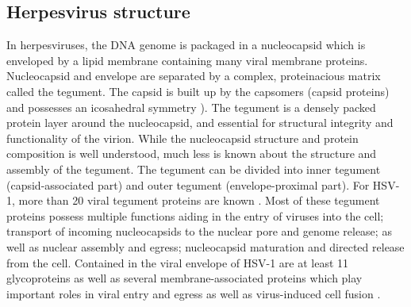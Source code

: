 \pagebreak

\subsection{Herpesvirus structure}
In herpesviruses, the DNA genome is packaged in a nucleocapsid which is enveloped by a lipid membrane containing many viral membrane proteins.
Nucleocapsid and envelope are separated by a complex, proteinacious matrix called the tegument.
The \gls{capsid} is built up by the capsomers (capsid proteins) and possesses an icosahedral symmetry \cite{[4]}).
The tegument is a densely packed protein layer around the nucleocapsid, and essential for structural integrity and functionality of the virion.
While the nucleocapsid structure and protein composition is well understood, much less is known about the structure and assembly of the tegument.
The tegument can be divided into inner tegument (capsid-associated part) and outer tegument (envelope-proximal part).
For HSV-1, more than 20 viral tegument proteins are known \cite{[5, 6]}.
Most of these tegument proteins possess multiple functions aiding in the entry of viruses into the cell; transport of incoming nucleocapsids to the nuclear pore and genome release; as well as nuclear assembly and egress; nucleocapsid maturation and directed release from the cell.
Contained in the viral envelope of HSV-1 are at least 11 glycoproteins as well as several membrane-associated proteins which play important roles in viral entry and egress as well as virus-induced cell fusion \cite{[2, 7]}.

